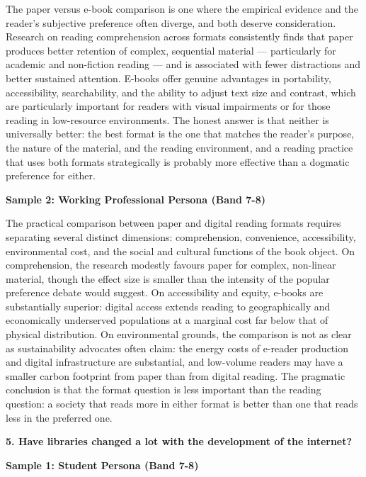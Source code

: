 The paper versus e-book comparison is one where the empirical evidence and the reader's subjective preference often diverge, and both deserve consideration. Research on reading comprehension across formats consistently finds that paper produces better retention of complex, sequential material — particularly for academic and non-fiction reading — and is associated with fewer distractions and better sustained attention. E-books offer genuine advantages in portability, accessibility, searchability, and the ability to adjust text size and contrast, which are particularly important for readers with visual impairments or for those reading in low-resource environments. The honest answer is that neither is universally better: the best format is the one that matches the reader's purpose, the nature of the material, and the reading environment, and a reading practice that uses both formats strategically is probably more effective than a dogmatic preference for either.

\textbf{Sample 2: Working Professional Persona (Band 7-8)}

The practical comparison between paper and digital reading formats requires separating several distinct dimensions: comprehension, convenience, accessibility, environmental cost, and the social and cultural functions of the book object. On comprehension, the research modestly favours paper for complex, non-linear material, though the effect size is smaller than the intensity of the popular preference debate would suggest. On accessibility and equity, e-books are substantially superior: digital access extends reading to geographically and economically underserved populations at a marginal cost far below that of physical distribution. On environmental grounds, the comparison is not as clear as sustainability advocates often claim: the energy costs of e-reader production and digital infrastructure are substantial, and low-volume readers may have a smaller carbon footprint from paper than from digital reading. The pragmatic conclusion is that the format question is less important than the reading question: a society that reads more in either format is better than one that reads less in the preferred one.

\separator

\begin{ieltsquestion}
\textbf{5. Have libraries changed a lot with the development of the internet?}
\end{ieltsquestion}
\textbf{Sample 1: Student Persona (Band 7-8)}

